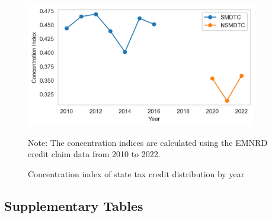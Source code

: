 \documentclass[12pt,twoside,letterpaper]{article}
\begin{document}
\begin{figure}[H]
    \centering
\includegraphics[width=0.9\textwidth]{figures/concentration_index_by_year.png}
    \caption{Concentration index of state tax credit distribution by year}
    \label{fig:concentration_index}
          \begin{flushleft}
        \footnotesize Note: The concentration indices are calculated using the EMNRD credit claim data from 2010 to 2022.  
    \end{flushleft}
\end{figure}

\newpage

\subsection{Supplementary Tables}
\end{document}

